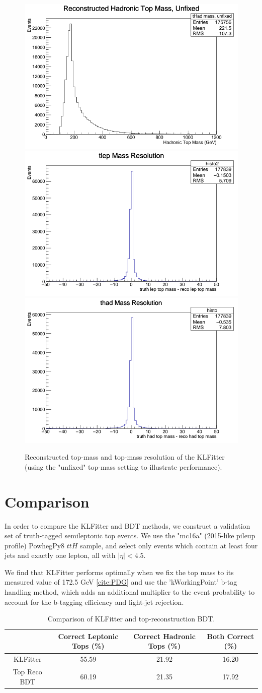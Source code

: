\begin{figure}
	\centering
	\includegraphics[width=0.31\linewidth]{figures/KLFitter/KLFittertopmass.png}
	\includegraphics[width=0.31\linewidth]{figures/KLFitter/KLfitter1.png}
	\includegraphics[width=0.31\linewidth]{figures/KLFitter/KLfitter2.png}
	\caption{Reconstructed top-mass and top-mass resolution of the KLFitter (using the "unfixed" top-mass setting to illustrate performance).}
	\label{fig:sel_topReco_retrain}
\end{figure}

\section{Comparison} \label{sec:comparison} 

In order to compare the KLFitter and BDT methods, we construct a validation set of truth-tagged semileptonic top events. We use the "mc16a" (2015-like pileup profile) PowhegPy8 $ttH$ sample, and select only events which contain at least four jets and exactly one lepton, all with $|\eta|< 4.5$.

We find that KLFitter performs optimally when we fix the top mass to its measured value of 172.5 GeV \ref{cite:PDG} and use the 'kWorkingPoint' b-tag handling method, which adds an additional multiplier to the event probability to account for the b-tagging efficiency and light-jet rejection. 

\begin{table}[h]
    \centering
    \begin{tabular}{|c|c|c|c|}
    \hline
    & Correct Leptonic Tops (\%) & Correct Hadronic Tops (\%) & Both Correct (\%) \\ \hline
    KLFitter & 55.59 & 21.92 & 16.20 \\ \hline
    Top Reco BDT & 60.19 & 21.35 & 17.92 \\ \hline   	
    \end{tabular}
    \caption{Comparison of KLFitter and top-reconstruction BDT.}
    \label{KLFitterTable}
\end{table}
